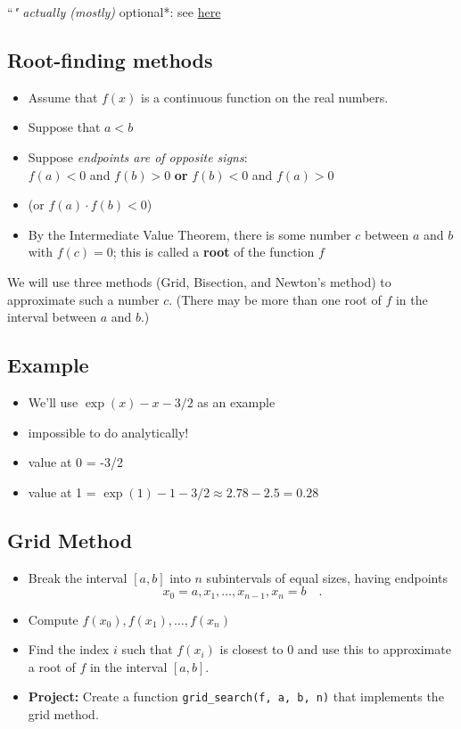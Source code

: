 \documentclass[]{tufte-handout}
\providecommand{\tightlist}{%
  \setlength{\itemsep}{0pt}\setlength{\parskip}{0pt}}
\begin{document}
``\emph{" actually (mostly) }optional*: see
\href{https://stackoverflow.com/questions/4978567/should-a-return-statement-have-parentheses}{here}

\subsection{Root-finding methods}\label{root-finding-methods}

\begin{itemize}
\tightlist
\item
  Assume that \(f(x)\) is a continuous function on the real numbers.
\item
  Suppose that \(a < b\)
\item
  Suppose \emph{endpoints are of opposite signs}:\\
  \(f(a)<0\) and \(f(b)> 0\) \textbf{or} \(f(b)<0\) and \(f(a)>0\)
\item
  (or \(f(a)\cdot f(b) <0\))
\item
  By the Intermediate Value Theorem, there is some number \(c\) between
  \(a\) and \(b\) with \(f(c) = 0\); this is called a \textbf{root} of
  the function \(f\)
\end{itemize}

We will use three methods (Grid, Bisection, and Newton's method) to
approximate such a number \(c\). (There may be more than one root of
\(f\) in the interval between \(a\) and \(b\).)

\subsection{Example}\label{example}

\begin{itemize}
\tightlist
\item
  We'll use \(\exp(x)-x-3/2\) as an example
\item
  impossible to do analytically!
\item
  value at 0 = -3/2
\item
  value at 1 = \(\exp(1)-1-3/2 \approx 2.78 - 2.5 = 0.28\)
\end{itemize}

\subsection{Grid Method}\label{grid-method}

\begin{itemize}
\tightlist
\item
  Break the interval \([a, b]\) into \(n\) subintervals of equal sizes,
  having endpoints \[
  x_0 = a, x_1 , \dots , x_{n−1} , x_n = b \quad .
  \]
\item
  Compute \(f(x_0), f(x_1), \dots , f(x_n)\)
\item
  Find the index \(i\) such that \(f(x_i)\) is closest to 0 and use this
  to approximate a root of \(f\) in the interval \([a, b]\).
\item
  \textbf{Project:} Create a function
  \texttt{grid\_search(f,\ a,\ b,\ n)} that implements the grid method.
\end{itemize}
\end{document}
